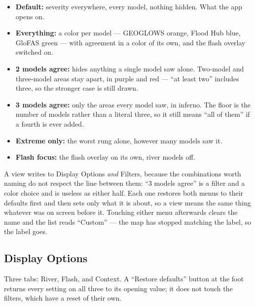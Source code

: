 \begin{itemize}
\item
  \textbf{Default:} severity everywhere, every model, nothing hidden. What the app opens on.
\item
  \textbf{Everything:} a color per model --- GEOGLOWS orange, Flood Hub blue, GloFAS green --- with agreement in a color of its own, and the flash overlay switched on.
\item
  \textbf{2 models agree:} hides anything a single model saw alone. Two-model and three-model areas stay apart, in purple and red --- ``at least two'' includes three, so the stronger case is still drawn.
\item
  \textbf{3 models agree:} only the areas every model saw, in inferno. The floor is the number of models rather than a literal three, so it still means ``all of them'' if a fourth is ever added.
\item
  \textbf{Extreme only:} the worst rung alone, however many models saw it.
\item
  \textbf{Flash focus:} the flash overlay on its own, river models off.
\end{itemize}

A view writes to Display Options \emph{and} Filters, because the combinations worth naming do not respect the line between them: ``3 models agree'' is a filter and a color choice and is useless as either half.
Each one restores both menus to their defaults first and then sets only what it is about, so a view means the same thing whatever was on screen before it.
Touching either menu afterwards clears the name and the list reads ``Custom'' --- the map has stopped matching the label, so the label goes.

\subsection{Display Options}\label{display-options}

Three tabs: River, Flash, and Context.
A ``Restore defaults'' button at the foot returns every setting on all three to its opening value; it does not touch the filters, which have a reset of their own.

